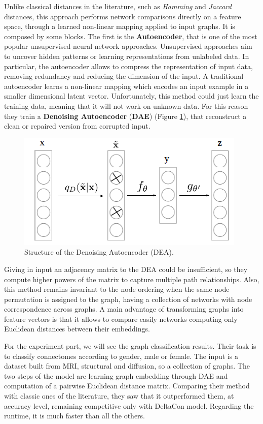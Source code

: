 Unlike classical distances in the literature, such as \textit{Hamming} and \textit{Jaccard} distances, this approach performs network comparisons directly on a feature space, through a learned non-linear mapping applied to input graphs. It is composed by some blocks. The first is the \textbf{Autoencoder}, that is one of the most popular unsupervised neural network approaches. Unsupervised approaches aim to uncover hidden patterns or learning representations from unlabeled data. In particular, the autoencoder allows to compress the representation of input data, removing redundancy and reducing the dimension of the input. A traditional autoencoder learns a non-linear mapping which encodes an input example in a smaller dimensional latent vector. Unfortunately, this method could just learn the training data, meaning that it will not work on unknown data. For this reason they train a \textbf{Denoising Autoencoder} (\textbf{DAE}) (Figure \ref{fig:diagram12}), that reconstruct a clean or repaired version from corrupted input.
\vspace{0.5cm}

\begin{figure}[htbp]
	\centering
	\includegraphics[scale=0.5]{Immagini/unsupervised2.PNG}
	\caption{Structure of the Denoising Autoencoder (DEA).}
	\label{fig:diagram12}
\end{figure}
 
Giving in input an adjacency matrix to the DEA could be insufficient, so they compute higher powers of the matrix to capture multiple path relationships. Also, this method remains invariant to the node ordering when the same node permutation is assigned to the graph, having a collection of networks with node correspondence across graphs. A main advantage of transforming graphs into feature vectors is that it allows to compare easily networks computing only Euclidean distances between their
embeddings.
\vspace{0.5cm}

For the experiment part, we will see the graph classification results. Their task is to classify connectomes according to gender, male or female. The input is a dataset built from MRI, structural and diffusion, so a collection of graphs. The two steps of the model are learning graph embedding through DAE and computation of a pairwise Euclidean distance matrix. Comparing their method with classic ones of the literature, they saw that it outperformed them, at accuracy level, remaining competitive only with DeltaCon model. Regarding the runtime, it is much faster than all the others.


